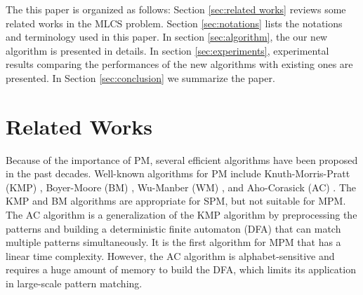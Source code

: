 The this paper is organized as follows: Section \ref{sec:related
  works} reviews some related works in the MLCS problem. Section
\ref{sec:notations} lists the notations and terminology used in this
paper. In section \ref{sec:algorithm}, the our new algorithm is
presented in details. In section \ref{sec:experiments}, experimental
results comparing the performances of the new algorithms with existing
ones are presented. In Section \ref{sec:conclusion} we summarize the
paper.

\section{Related Works}
\label{sec:related works}

Because of the importance of PM, several efficient algorithms have
been proposed in the past decades. Well-known algorithms for PM
include Knuth-Morris-Pratt (\textsf{KMP}) \cite{Knuth1977},
Boyer-Moore (\textsf{BM}) \cite{Boyer1977}, Wu-Manber (\textsf{WM})
\cite{Wu1994}, and Aho-Corasick (\textsf{AC}) \cite{Aho1975}. The
\textsf{KMP} and \textsf{BM} algorithms are appropriate for SPM, but
not suitable for MPM. The \textsf{AC} algorithm is a generalization of
the \textsf{KMP} algorithm by preprocessing the patterns and building
a deterministic finite automaton (DFA) that can match multiple
patterns simultaneously. It is the first algorithm for MPM that has a
linear time complexity. However, the \textsf{AC} algorithm is
alphabet-sensitive and requires a huge amount of memory to build the
DFA, which limits its application in large-scale pattern matching.

